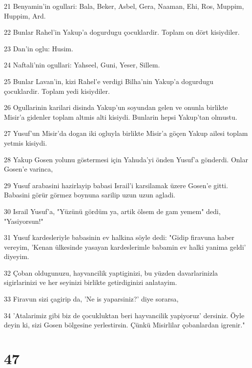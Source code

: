 \par 21 Benyamin'in ogullari: Bala, Beker, Asbel, Gera, Naaman, Ehi, Ros, Muppim, Huppim, Ard.
\par 22 Bunlar Rahel'in Yakup'a dogurdugu çocuklardir. Toplam on dört kisiydiler.
\par 23 Dan'in oglu: Husim.
\par 24 Naftali'nin ogullari: Yahseel, Guni, Yeser, Sillem.
\par 25 Bunlar Lavan'in, kizi Rahel'e verdigi Bilha'nin Yakup'a dogurdugu çocuklardir. Toplam yedi kisiydiler.
\par 26 Ogullarinin karilari disinda Yakup'un soyundan gelen ve onunla birlikte Misir'a gidenler toplam altmis alti kisiydi. Bunlarin hepsi Yakup'tan olmustu.
\par 27 Yusuf'un Misir'da dogan iki ogluyla birlikte Misir'a göçen Yakup ailesi toplam yetmis kisiydi.
\par 28 Yakup Gosen yolunu göstermesi için Yahuda'yi önden Yusuf'a gönderdi. Onlar Gosen'e varinca,
\par 29 Yusuf arabasini hazirlayip babasi Israil'i karsilamak üzere Gosen'e gitti. Babasini görür görmez boynuna sarilip uzun uzun agladi.
\par 30 Israil Yusuf'a, "Yüzünü gördüm ya, artik ölsem de gam yemem" dedi, "Yasiyorsun!"
\par 31 Yusuf kardesleriyle babasinin ev halkina söyle dedi: "Gidip firavuna haber vereyim, 'Kenan ülkesinde yasayan kardeslerimle babamin ev halki yanima geldi' diyeyim.
\par 32 Çoban oldugunuzu, hayvancilik yaptiginizi, bu yüzden davarlarinizla sigirlarinizi ve her seyinizi birlikte getirdiginizi anlatayim.
\par 33 Firavun sizi çagirip da, 'Ne is yaparsiniz?' diye sorarsa,
\par 34 'Atalarimiz gibi biz de çocukluktan beri hayvancilik yapiyoruz' dersiniz. Öyle deyin ki, sizi Gosen bölgesine yerlestirsin. Çünkü Misirlilar çobanlardan igrenir."

\chapter{47}

